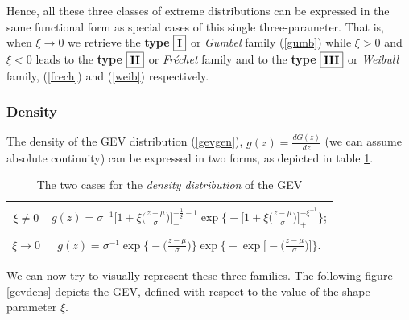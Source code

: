 

Hence, all these three classes of extreme distributions can be expressed in the same functional form as special cases of this single three-parameter. That is, when $\xi\rightarrow 0$ we retrieve the \textbf{type} $\boxed{\textbf{\text{I}}}$ or \emph{Gumbel} family (\ref{gumb}) while $\xi >0$ and $\xi <0$ leads to the \textbf{type} $\boxed{\textbf{\text{II}}}$  or \emph{Fréchet} family and to the \textbf{type} $\boxed{\textbf{\text{III}}}$ or \emph{Weibull} family, (\ref{frech}) and (\ref{weib}) respectively. 



\subsubsection*{Density} 
The density of the GEV distribution (\ref{gevgen}), $g(z)=\frac{d G(z)}{dz}$ (we can assume absolute continuity) can be expressed in two forms, as depicted in table \ref{tab:gevdens}.

\begin{table}[!htb]
\centering\caption{The two cases for the \emph{density distribution} of the GEV}\label{tab:gevdens}
\begin{tabular}{|c|c}
\hline \\
$\xi\neq 0$ &  $g(z)=\sigma^{-1}\bigg[1+\xi\bigg(\frac{z-\mu}{\sigma}\bigg)\bigg]_+^{-\frac{1}{\xi}-1}\exp\Bigg\{-\bigg[1+\xi\bigg(\frac{z-\mu}{\sigma}\bigg)\bigg]_+^{-\xi^{-1}}\Bigg\}$; \\
 \hline  \\
$\xi\to 0$ & $g(z)= \sigma^{-1}\exp\bigg\{-\bigg(\frac{z-\mu}{\sigma}\bigg)\bigg\}\exp\Bigg\{-\exp\bigg[-\bigg(\frac{z-\mu}{\sigma}\bigg)\bigg]\Bigg\}$. \\ 
\hline 
\end{tabular}
\end{table}

We can now try to visually represent these three families. The following figure \ref{gevdens} depicts the GEV, defined with respect to the value of the shape parameter $\xi$. 

